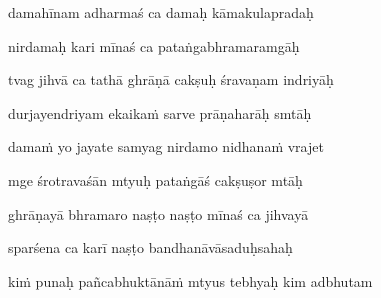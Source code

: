 damahīnam adharmaś ca damaḥ kāmakulapradaḥ \veg\dontdisplaylinenum

nirdamaḥ kari mīnaś ca pataṅgabhramaramgāḥ\thinspace{\dandab} \dontdisplaylinenum

tvag jihvā ca tathā ghrāṇā cakṣuḥ śravaṇam indriyāḥ \veg\dontdisplaylinenum

durjayendriyam ekaika\.m sarve prāṇaharāḥ smtāḥ\thinspace{\dandab} \dontdisplaylinenum

dama\.m yo jayate samyag nirdamo nidhana\.m vrajet \veg\dontdisplaylinenum

mge śrotravaśān mtyuḥ pataṅgāś cakṣuṣor mtāḥ\thinspace{\dandab} \dontdisplaylinenum

ghrāṇayā bhramaro naṣṭo naṣṭo mīnaś ca jihvayā \veg\dontdisplaylinenum

sparśena ca karī naṣṭo bandhanāvāsaduḥsahaḥ\thinspace{\dandab} \dontdisplaylinenum

ki\.m punaḥ pañcabhuktānā\.m mtyus tebhyaḥ kim adbhutam \veg\dontdisplaylinenum

